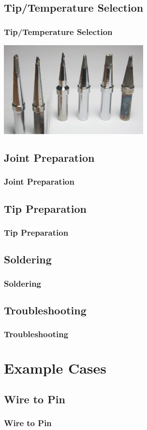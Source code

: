 \documentclass{beamer}
\begin{document}
\subsection{Tip/Temperature Selection}
\begin{frame}[t]
	\frametitle{Tip/Temperature Selection}
	\includegraphics[width=3in]{IronTips}
\end{frame}

\subsection{Joint Preparation}
\begin{frame}[t]
	\frametitle{Joint Preparation}
\end{frame}

\subsection{Tip Preparation}
\begin{frame}[t]
	\frametitle{Tip Preparation}
\end{frame}

\subsection{Soldering}
\begin{frame}[t]
	\frametitle{Soldering}
\end{frame}

\subsection{Troubleshooting}
\begin{frame}[t]
	\frametitle{Troubleshooting}
\end{frame}

\section{Example Cases}
\subsection{Wire to Pin}
\begin{frame}[t]
	\frametitle{Wire to Pin}
\end{frame}
\end{document}
